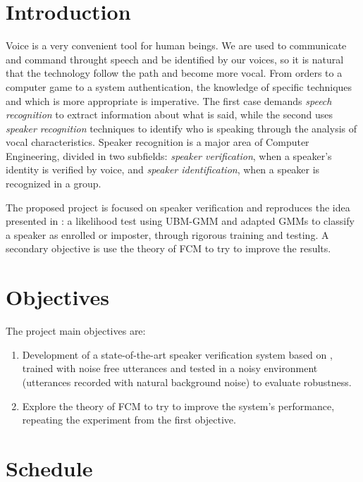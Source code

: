 \documentclass[a4paper,twocolumn]{article}
\begin{document}
\section{Introduction}
\label{ch:introduction}

Voice is a very convenient tool for human beings. We are used to communicate and command throught speech and be identified by our voices, so it is natural that the technology follow the path and become more vocal. From orders to a computer game to a system authentication, the knowledge of specific techniques and which is more appropriate is imperative. The first case demands \textit{speech recognition} to extract information about what is said, while the second uses \textit{speaker recognition} techniques to identify who is speaking through the analysis of vocal characteristics. Speaker recognition is a major area of Computer Engineering, divided in two subfields: \textit{speaker verification}, when a speaker's identity is verified by voice, and \textit{speaker identification}, when a speaker is recognized in a group.

The proposed project is focused on speaker verification and reproduces the idea presented in \cite{reynolds_et_al_2000}: a likelihood test using UBM-GMM and adapted GMMs to classify a speaker as enrolled or imposter, through rigorous training and testing. A secondary objective is use the theory of FCM \cite{gao_et_al_2013} to try to improve the results.


\section{Objectives}
\label{ch:objectives}

The project main objectives are:

\begin{enumerate}[noitemsep]
    \item Development of a state-of-the-art speaker verification system based on \cite{reynolds_et_al_2000}, trained with noise free utterances and tested in a noisy environment (utterances recorded with natural background noise) to evaluate robustness.
    \item Explore the theory of FCM to try to improve the system's performance, repeating the experiment from the first objective.
\end{enumerate}


\section{Schedule}
\label{ch:schedule}
\end{document}
